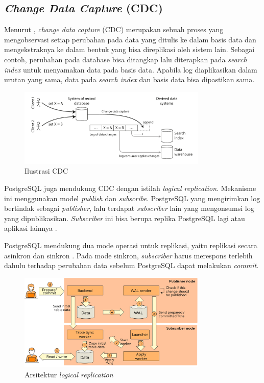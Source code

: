 \subsection{\textit{Change Data Capture} (CDC)}

Menurut \cite{dataIntensiveApplications}, \textit{change data capture} (CDC) merupakan sebuah proses yang mengobservasi setiap perubahan pada data yang ditulis ke dalam basis data dan mengekstraknya ke dalam bentuk yang bisa direplikasi oleh sistem lain. Sebagai contoh, perubahan pada database bisa ditangkap lalu diterapkan pada \textit{search index} untuk menyamakan data pada basis data. Apabila log diaplikasikan dalam urutan yang sama, data pada \textit{search index} dan basis data bisa dipastikan sama.

\begin{figure}[htbp]
    \centering
    \includegraphics[width=0.8\textwidth]{resources/chapter-2/cdc.png}
    \caption{Ilustrasi CDC \parencite{dataIntensiveApplications}}
    \label{fig:cdc-illustration}
\end{figure}

PostgreSQL juga mendukung CDC dengan istilah \textit{logical replication}. Mekanisme ini menggunakan model \textit{publish} dan \textit{subscribe}. PostgreSQL yang mengirimkan log bertindak sebagai \textit{publisher}, lalu terdapat \textit{subscriber} lain yang mengonsumsi log yang dipublikasikan. \textit{Subscriber} ini bisa berupa replika PostgreSQL lagi atau aplikasi lainnya \parencite{pgLogicalReplication}.

PostgreSQL mendukung dua mode operasi untuk replikasi, yaitu replikasi secara asinkron dan sinkron \parencite{insideLogicalReplication}. Pada mode sinkron, \textit{subscriber} harus merespons terlebih dahulu terhadap perubahan data sebelum PostgreSQL dapat melakukan \textit{commit}.

\begin{figure}[htbp]
    \centering
    \includegraphics[width=0.8\textwidth]{resources/chapter-2/postgres-logical-replication.png}
    \caption{Arsitektur \textit{logical replication} \parencite{insideLogicalReplication}}
    \label{fig:logical-replication-architecture}
\end{figure}

